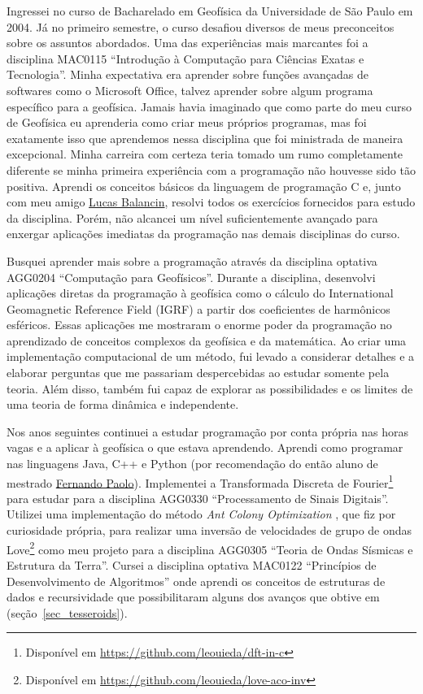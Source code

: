 \documentclass[10pt,a4paper,oneside]{book}
\begin{document}
Ingressei no curso de Bacharelado em Geofísica da Universidade de São Paulo em
2004.
Já no primeiro semestre, o curso desafiou diversos de meus preconceitos sobre
os assuntos abordados.
Uma das experiências mais marcantes foi a disciplina MAC0115 ``Introdução à
Computação para Ciências Exatas e Tecnologia''.
Minha expectativa era aprender sobre funções avançadas de softwares como o
Microsoft Office, talvez aprender sobre algum programa específico para a
geofísica.
Jamais havia imaginado que como parte do meu curso de Geofísica eu aprenderia
como criar meus próprios programas, mas foi exatamente isso que aprendemos
nessa disciplina que foi ministrada de maneira excepcional.
Minha carreira com certeza teria tomado um rumo completamente diferente se
minha primeira experiência com a programação não houvesse sido tão positiva.
Aprendi os conceitos básicos da linguagem de programação C e, junto com meu
amigo \href{https://www.linkedin.com/in/balancin/}{Lucas Balancin}, resolvi
todos os exercícios fornecidos para estudo da disciplina.
Porém, não alcancei um nível suficientemente avançado para enxergar aplicações
imediatas da programação nas demais disciplinas do curso.

Busquei aprender mais sobre a programação através da disciplina optativa
AGG0204 ``Computação para Geofísicos''.
Durante a disciplina, desenvolvi aplicações diretas da programação à geofísica
como o cálculo do International Geomagnetic Reference Field (IGRF) a partir dos
coeficientes de harmônicos esféricos.
Essas aplicações me mostraram o enorme poder da programação no aprendizado de
conceitos complexos da geofísica e da matemática.
Ao criar uma implementação computacional de um método, fui levado a considerar
detalhes e a elaborar perguntas que me passariam despercebidas ao estudar
somente pela teoria.
Além disso, também fui capaz de explorar as possibilidades e os limites de uma
teoria de forma dinâmica e independente.

Nos anos seguintes continuei a estudar programação por conta própria nas horas
vagas e a aplicar à geofísica o que estava aprendendo.
Aprendi como programar nas linguagens Java, C++ e Python (por recomendação do
então aluno de mestrado \href{https://www.linkedin.com/in/fspaolo/}{Fernando Paolo}).
Implementei a Transformada Discreta de Fourier\footnote{Disponível em
\url{https://github.com/leouieda/dft-in-c}} para estudar para a disciplina
AGG0330 ``Processamento de Sinais Digitais''.
Utilizei uma implementação do método \textit{Ant Colony Optimization}
\citep{Socha2008}, que fiz por curiosidade própria, para realizar uma inversão
de velocidades de grupo de ondas
Love\footnote{Disponível em \url{https://github.com/leouieda/love-aco-inv}}
como meu projeto para a disciplina AGG0305 ``Teoria de Ondas Sísmicas e
Estrutura da Terra''.
Cursei a disciplina optativa MAC0122 ``Princípios de Desenvolvimento de
Algoritmos'' onde aprendi os conceitos de estruturas de dados e recursividade
que possibilitaram alguns dos avanços que obtive em \citet{Uieda2016}
(seção~\ref{sec_tesseroids}).
\end{document}
